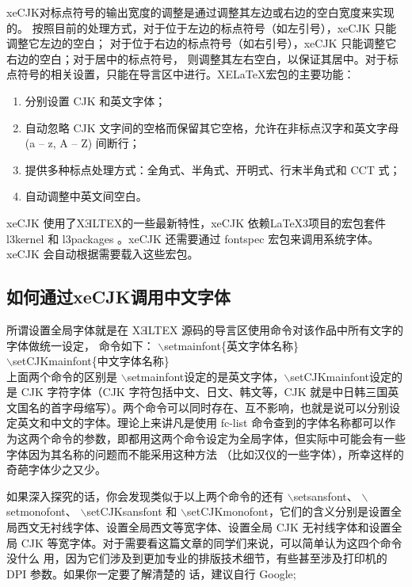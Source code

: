 \documentclass[10pt,a4paper,openany]{article}
\begin{document}
	xeCJK对标点符号的输出宽度的调整是通过调整其左边或右边的空白宽度来实现的。 按照目前的处理方式，对于位于左边的标点符号（如左引号），xeCJK 只能调整它左边的空白； 对于位于右边的标点符号（如右引号），xeCJK 只能调整它右边的空白；对于居中的标点符号， 则调整其左右空白，以保证其居中。对于标点符号的相关设置，只能在导言区中进行。XE\LaTeX 宏包的主要功能：
	\begin{enumerate}
		\item  {\kaishu 分别设置 CJK 和英文字体；}
		
		\item  {\kaishu 自动忽略 CJK 文字间的空格而保留其它空格，允许在非标点汉字和英文字母 (a – z, A – Z) 间断行；}
		
		\item   {\kaishu 提供多种标点处理方式：全角式、半角式、开明式、行末半角式和 CCT 式；}
		
		\item  {\kaishu 自动调整中英文间空白。 }
	\end{enumerate}
xeCJK 使用了XƎLTEX的一些最新特性，xeCJK 依赖\LaTeX 3项目的宏包套件 l3kernel 和 l3packages 。xeCJK 还需要通过 fontspec 宏包来调用系统字体。xeCJK 会自动根据需要载入这些宏包。


	 
	 
	\subsection{如何通过xeCJK调用中文字体}
	 
	 所谓设置全局字体就是在 XƎLTEX 源码的导言区使用命令对该作品中所有文字的字体做统一设定， 命令如下：
	$ \backslash $setmainfont\{英文字体名称\}\\
	$ \backslash $setCJKmainfont\{中文字体名称\}\\
	
	上面两个命令的区别是	$ \backslash $setmainfont设定的是英文字体，$ \backslash $setCJKmainfont设定的是 CJK 字符字体（CJK 字符包括中文、日文、韩文等，CJK 就是中日韩三国英文国名的首字母缩写）。两个命令可以同时存在、互不影响，也就是说可以分别设定英文和中文的字体。理论上来讲凡是使用 fc-list 命令查到的字体名称都可以作为这两个命令的参数，即都用这两个命令设定为全局字体，但实际中可能会有一些字体因为其名称的问题而不能采用这种方法 （比如汉仪的一些字体），所幸这样的奇葩字体少之又少。
	
	 如果深入探究的话，你会发现类似于以上两个命令的还有 	$ \backslash $setsansfont、	$ \backslash $setmonofont、	$ \backslash $setCJKsansfont 和 	$ \backslash $setCJKmonofont，它们的含义分别是设置全局西文无衬线字体、设置全局西文等宽字体、设置全局 CJK 无衬线字体和设置全局 CJK 等宽字体。对于需要看这篇文章的同学们来说，可以简单认为这四个命令没什么 用，因为它们涉及到更加专业的排版技术细节，有些甚至涉及打印机的 DPI 参数。如果你一定要了解清楚的 话，建议自行 Google;
	
\end{document}
